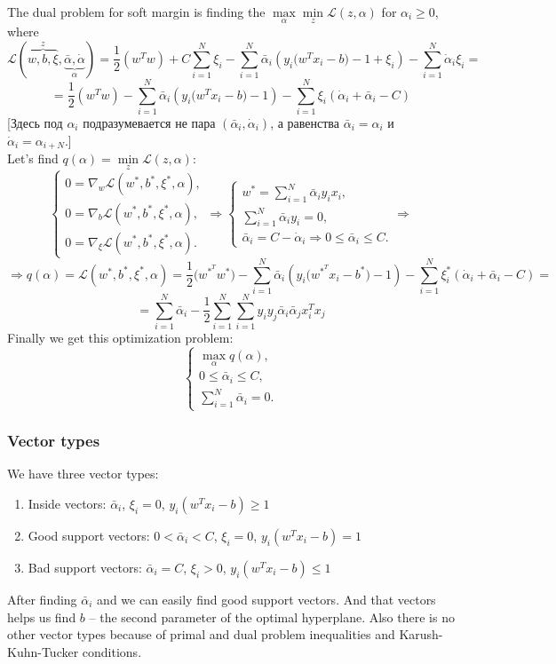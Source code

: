 The dual problem for soft margin is finding the $\max\limits_{\alpha}\min\limits_{z}\mathcal{L}(z,\alpha)$ for $\alpha_i\ge0$, where
$$\mathcal{L}(\overbrace{w,b,\xi}^{z},\underbrace{\bar\alpha,\dot\alpha}_{\alpha})=\frac{1}{2}(w^Tw)+C\sum\limits_{i=1}^{N}\xi_i-\sum\limits_{i=1}^{N}\bar\alpha_i(y_i\big(w^Tx_i-b\big)-1+\xi_i)-\sum\limits_{i=1}^{N}\dot\alpha_i\xi_i=$$
$$=\frac{1}{2}(w^Tw)-\sum\limits_{i=1}^{N}\bar\alpha_i(y_i\big(w^Tx_i-b\big)-1)-\sum\limits_{i=1}^{N}\xi_i(\dot\alpha_i+\bar\alpha_i-C)$$
[Здесь под $\alpha_i$ подразумевается не пара $(\bar\alpha_i,\dot\alpha_i)$, а равенства $\bar\alpha_i = \alpha_i$ и $\dot\alpha_i=\alpha_{i+N}$.]\\
Let's find $q(\alpha)=\min\limits_{z}\mathcal{L}(z,\alpha)$:
$$\begin{cases}
	0=\nabla_w\mathcal{L}(w^*,b^*,\xi^*,\alpha), \\
	0=\nabla_b\mathcal{L}(w^*,b^*,\xi^*,\alpha), \\
	0=\nabla_\xi\mathcal{L}(w^*,b^*,\xi^*,\alpha).
\end{cases}\Longrightarrow
\begin{cases}
	w^*=\sum\limits_{i=1}^{N}\bar\alpha_iy_ix_i, \\
	\sum\limits_{i=1}^{N}\bar\alpha_iy_i=0, \\
	\bar\alpha_i=C-\dot\alpha_i\Rightarrow 0\le\bar\alpha_i\le C.
\end{cases}\Longrightarrow$$
$$\Longrightarrow q(\alpha)=\mathcal{L}(w^*,b^*,\xi^*,\alpha)=\frac{1}{2}\big(w^{*^T}w^*\big)-\sum\limits_{i=1}^{N}\bar\alpha_i(y_i\big(w^{*^T}x_i-b^*\big)-1)-\sum\limits_{i=1}^{N}\xi_i^*(\dot\alpha_i+\bar\alpha_i-C)=$$
$$=\sum\limits_{i=1}^{N}\bar\alpha_i-\frac{1}{2}\sum\limits_{i=1}^{N}\sum\limits_{i=1}^{N}y_iy_j\bar\alpha_i\bar\alpha_jx_i^Tx_j$$
Finally we get this optimization problem:
$$\begin{cases}
	\max\limits_{\alpha}q(\alpha), \\
	0\le\bar\alpha_i\le C, \\
	\sum\limits_{i=1}^{N}\bar\alpha_i=0.
\end{cases}$$

\subsubsection*{Vector types}

We have three vector types:
\begin{enumerate}[label=\arabic*.]
	\item Inside vectors: $\bar\alpha_i$, $\xi_i=0$, $y_i(w^Tx_i-b)\ge1$
	\item Good support vectors: $0<\bar\alpha_i<C$, $\xi_i=0$, $y_i(w^Tx_i-b)=1$
	\item Bad support vectors: $\bar\alpha_i=C$, $\xi_i>0$, $y_i(w^Tx_i-b)\le1$
\end{enumerate}
After finding $\bar\alpha_i$ and we can easily find good support vectors. And that vectors helps us find $b$ -- the second parameter of the optimal hyperplane. Also there is no other vector types because of primal and dual problem inequalities and Karush-Kuhn-Tucker conditions.

